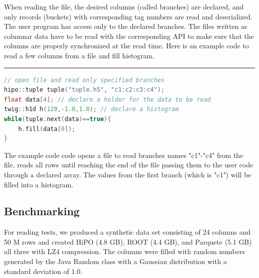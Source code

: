 When reading the file, the desired columns (called branches) are declared, and only records (buckets) with corresponding tag numbers are read and deserialized.
The user program has access only to the declared branches. The files written as columnar data have to be read with the corresponding API to make sure that the columns 
are properly synchronized at the read time. Here is an example code to read a few columns from a file and fill histogram. 
\rule{16.5cm}{0.4pt}
\begin{lstlisting}[language=c++, caption=c++ example to read tuple file and fill histogram.]
// open file and read only specified branches
hipo::tuple tuple("tuple.h5", "c1:c2:c3:c4"); 
float data[4]; // declare a holder for the data to be read
twig::h1d h(120,-1.0,1.0); // declare a histogram
while(tuple.next(data)==true){
    h.fill(data[0]);
}
\end{lstlisting}

The example code code opens a file to read branches names "c1"-"c4" from the file, reads all rows until reaching the end of the file passing them to the user code through a declared array.
The values from the first branch (which is "c1") will be filled into a histogram.

\subsection{Benchmarking}

For reading tests, we produced a synthetic data set consisting of 24 columns and 50 M rows and created HiPO (4.8 GB), ROOT (4.4 GB), and Parquete (5.1 GB) all three with 
LZ4 compression. The columns were filled with random numbers generated by the Java Random class with a Gaussian distribution with a standard deviation of 1.0. 

